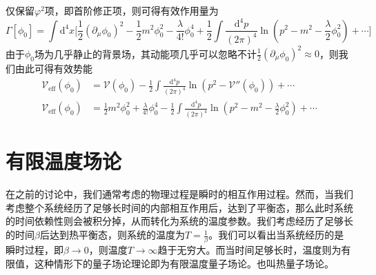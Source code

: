 仅保留$\varphi^2$项，即首阶修正项，则可得有效作用量为
\begin{equation}
    \Gamma[\phi_0] = \int\mathrm{d}^4x \Big[ \frac{1}{2}(\partial_\mu \phi_0)^2- \frac{1}{2}m^2\phi_0^2 -\frac{\lambda}{4!}\phi_0^4 +\frac{1}{2}\int\frac{\mathrm{d}^4p}{(2\pi)^4}\ln\left( p^2 -m^2-\frac{\lambda}{2}\phi_0^2 \right)+\cdots\Big]
\end{equation}
由于$\phi_0$场为几乎静止的背景场，其动能项几乎可以忽略不计$\frac{1}{2}(\partial_\mu\phi_0)^2\approx 0$，则我们由此可得有效势能
\begin{align}
\mathscr{V}_\mathrm{eff}(\phi_0) &= \mathscr{V}(\phi_0) - \frac{1}{2}\int\frac{\mathrm{d}^4p}{(2\pi)^4}\ln\left( p^2 -\mathscr{V}''(\phi_0) \right)+\cdots \\
    \mathscr{V}_\mathrm{eff}(\phi_0) &= \frac{1}{2}m^2\phi_0^2 +\frac{\lambda}{4!}\phi_0^4 - \frac{1}{2}\int\frac{\mathrm{d}^4p}{(2\pi)^4}\ln\left( p^2 -m^2-\frac{\lambda}{2}\phi_0^2 \right)+\cdots
\end{align}

\chapter{有限温度场论}
在之前的讨论中，我们通常考虑的物理过程是瞬时的相互作用过程。然而，当我们考虑整个系统经历了足够长时间的内部相互作用后，达到了平衡态，那么此时系统的时间依赖性则会被积分掉，从而转化为系统的温度参数。我们考虑经历了足够长的时间$\beta$后达到热平衡态，则系统的温度为$T=\frac{1}{\beta}$。我们可以看出当系统经历的是瞬时过程，即$\beta\rightarrow0$，则温度$T\rightarrow\infty$趋于无穷大。而当时间足够长时，温度则为有限值，这种情形下的量子场论理论即为有限温度量子场论。也叫热量子场论。

